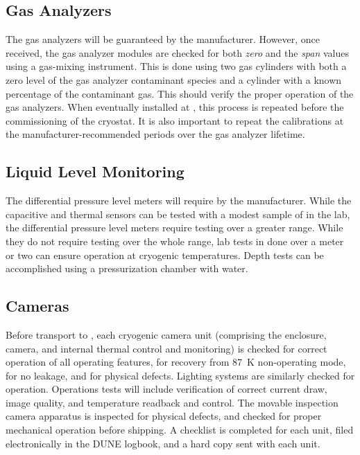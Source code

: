\subsection{Gas Analyzers}
\label{sec:fdgen-slow-cryo-qc-ga}

The gas analyzers will be guaranteed by the manufacturer. However, once received, the gas analyzer modules are checked for both \textit{zero} and the \textit{span} values using a gas-mixing instrument. This is done using two gas cylinders with both a zero level of the gas analyzer contaminant species and a cylinder with a known percentage of the contaminant gas. This should verify the proper operation of the gas analyzers. When eventually installed at \surf, this process is repeated before the commissioning of the cryostat. It is also important to repeat the calibrations at the manufacturer-recommended periods over the gas analyzer lifetime.


\subsection{Liquid Level Monitoring}
\label{sec:fdgen-slow-cryo-qc-llm}

The differential pressure level meters will require  by the manufacturer.
While the capacitive and thermal sensors can be tested with a modest sample of \lar in the lab,
the differential pressure level meters require testing over a greater range.  While they do not
require testing over the whole range,  lab tests  in \lar 
done over a meter or two can ensure operation
at cryogenic temperatures.  Depth tests can be accomplished using a
pressurization chamber with water.


\subsection{Cameras}
\label{sec:fdgen-slow-cryo-qc-c}

Before transport to \surf, each cryogenic camera unit (comprising the enclosure, camera, and internal thermal control and monitoring) is checked for correct operation of all operating features, for recovery from \SI{87}{K} non-operating mode, for no leakage, and for physical defects. Lighting systems are similarly checked for operation. Operations tests will include verification of correct current draw, image quality, and temperature readback and control. The movable inspection camera apparatus is inspected for physical defects, and checked for proper mechanical operation before shipping. A checklist is completed for each unit, filed electronically in the DUNE logbook, and a hard copy sent with each unit. 

